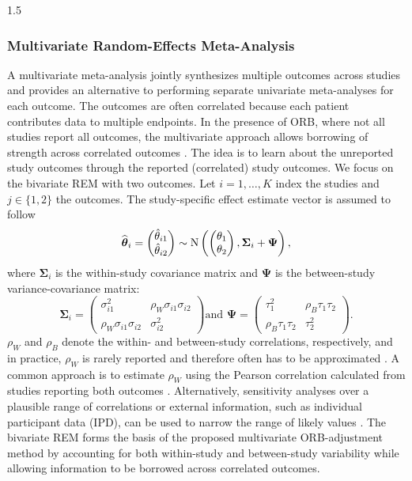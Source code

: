 \documentclass{article}
\begin{document}
\begin{spacing}{1.5}
\subsubsection{Multivariate Random-Effects Meta-Analysis}
\label{multivariate}
A multivariate meta-analysis jointly synthesizes multiple outcomes across studies and provides an alternative to performing separate univariate meta-analyses for each outcome. The outcomes are often correlated because each patient contributes data to multiple endpoints. In the presence of ORB, where not all studies report all outcomes, the multivariate approach allows borrowing of strength across correlated outcomes \cite{jackson2011multivariate, kirkham2012multivariate, schmid2020handbook}. The idea is to learn about the unreported study outcomes through the reported (correlated) study outcomes. We focus on the bivariate REM with two outcomes. Let $i = 1,\dots,K$ index the studies and $j \in \{1,2\}$ the outcomes. The study-specific effect estimate vector is assumed to follow
\begin{equation*}
\label{eq:multivariate_hetero}
\widehat{\boldsymbol{\theta}}_{i} =
\begin{pmatrix}
\hat{\theta}_{i1}\\
\hat{\theta}_{i2}
\end{pmatrix}
\sim
\operatorname{N}\left(
\begin{pmatrix}
\theta_1\\
\theta_2
\end{pmatrix},
\boldsymbol{\Sigma}_i+\boldsymbol{\Psi}
\right),
\end{equation*}
where $\boldsymbol{\Sigma}_i$ is the within-study covariance matrix and $\boldsymbol{\Psi}$ is the between-study variance-covariance matrix:
\begin{equation*}
\boldsymbol{\Sigma}_i=
\begin{pmatrix}
\sigma_{i1}^2 & \rho_W \sigma_{i1}\sigma_{i2}\\
\rho_W \sigma_{i1}\sigma_{i2} & \sigma_{i2}^2
\end{pmatrix} \text{and }
\boldsymbol{\Psi}=
\begin{pmatrix}
\tau_1^2 & \rho_B\tau_1\tau_2\\
\rho_B\tau_1\tau_2 & \tau_2^2
\end{pmatrix}.
\end{equation*}
$\rho_W$ and $\rho_B$ denote the within- and between-study correlations, respectively, and in practice, $\rho_W$ is rarely reported and therefore often has to be approximated \cite{riley2009multivariate, jackson2011multivariate}. A common approach is to estimate $\rho_W$ using the Pearson correlation calculated from studies reporting both outcomes \cite{kirkham2012multivariate}. Alternatively, sensitivity analyses over a plausible range of correlations or external information, such as individual participant data (IPD), can be used to narrow the range of likely values \cite{jackson2011multivariate, kirkham2012multivariate, mavridis2013practical, schmid2020handbook}. The bivariate REM forms the basis of the proposed multivariate ORB-adjustment method by accounting for both within-study and between-study variability while allowing information to be borrowed across correlated outcomes.


\end{spacing}
\end{document}
